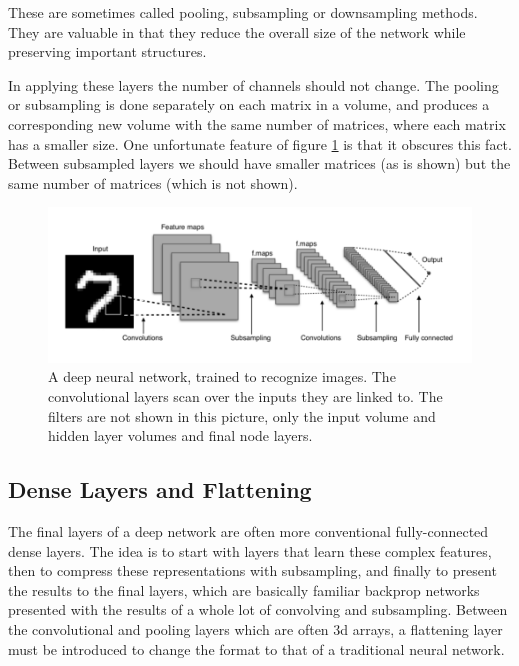 These are sometimes called pooling, subsampling or downsampling methods. They are valuable in that they reduce the overall size of the network while preserving important structures.

In applying these layers the number of channels should not change. The pooling or subsampling is done separately on each matrix in a volume, and produces a corresponding new volume with the same number of matrices, where each matrix has a smaller size. One unfortunate feature of figure \ref{deep_net2} is that it obscures this fact. Between subsampled layers we should have smaller matrices (as is shown) but the same number of matrices (which is not shown).

\begin{figure}[h]
\centering
\includegraphics[scale=.45]{./images/deepNet.png}
\caption[Adapted from a creative commons image by Aphex34 at \url{https://commons.wikimedia.org/wiki/File:Typical_cnn.png} ]{A deep neural network, trained to recognize images. The convolutional layers scan over the inputs they are linked to. The filters are not shown in this picture, only the input volume and hidden layer volumes and final node layers. }
\label{deep_net2}
\end{figure}

\subsection{Dense Layers and Flattening}


The final layers of a deep network are often more conventional fully-connected dense layers. The idea is to start with layers that learn these complex features, then to compress these representations with subsampling, and finally to present the results to the final layers, which are basically familiar backprop networks presented with the results of a whole lot of convolving and subsampling. Between the convolutional and pooling layers which are often 3d arrays, a flattening layer must be introduced to change the format to that of a traditional neural network.

